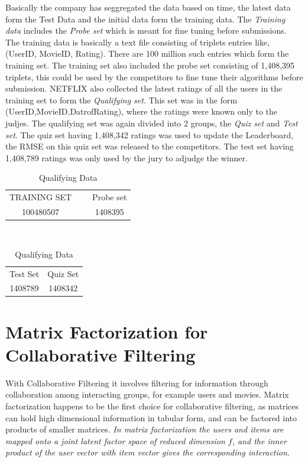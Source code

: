  Basically the company has seggregated the data based on time, the latest data
form the Test Data and the initial data form the training data. The
\emph{Training data} includes the \emph{Probe set} which is meant for fine
tuning before submissions. The training data is basically a text file consisting
of triplets entries like, (UserID, MovieID, Rating). There are 100 million such
entries which form the training set. The training set also included the probe
set consisting of 1,408,395 triplets, this could be used by the competitors to
fine tune their algorithms before submission. NETFLIX also collected the latest
ratings of all the users in the training set to form the \emph{Qualifying set}.
This set was in the form (UserID,MovieID,DatrofRating), where the ratings were
known only to the judjes. The qualifying set was again divided into 2 groups,
the \emph{Quiz set} and \emph{Test set}. The quiz set having 1,408,342 ratings
was used to update the Leaderboard, the RMSE on this quiz set was released to
the competitors. The test set having 1,408,789 ratings was only used by the jury
to adjudge the winner. \cite{Bennett07thenetflix}\\



 
\begin{table}
\begin{center}
    \begin{tabular}{|ccc|}
        \hline
         TRAINING SET  & ~ &  Probe set  \\ 
         100480507 & ~ & 1408395   \\ \hline       
    \end{tabular} \\
    \caption[]{Training Data}
     \begin{tabular}{|c|c|}
       \hline
       Test Set  & Quiz Set  \\ 
       1408789 & 1408342 \\ \hline       
    \end{tabular}
    \caption{Qualifying Data}     
\end{center}
\end{table}


\section{Matrix Factorization for Collaborative Filtering}
With Collaborative Filtering it involves filtering for information through
collaboration among interacting groups, for example users and movies. Matrix
factorization happens to be the first choice for collaborative filtering, as
matrices can hold high dimensional information in tabular form, and can be
factored into products of smaller matrices. \emph{In matrix factorization the
users and items are mapped onto a joint latent factor space of reduced dimension
$f$, and the inner product of the user vector with item vector gives the
corresponding interaction.} \cite{Koren:2009:MFT:1608565.1608614}
